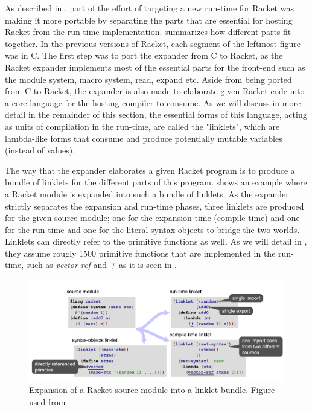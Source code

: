 \label{subsec:racket-expand}

As described in , part of the effort of targeting a
new run-time for Racket was making it more portable by separating the
parts that are essential for hosting Racket from the run-time
implementation.  summarizes how different
parts fit together. In the previous versions of Racket, each segment
of the leftmost figure was in C. The first step was to port the
expander from C to Racket, as the Racket expander implements most of
the essential parts for the front-end such as the module system, macro
system, read, expand etc. Aside from being ported from C to Racket,
the expander is also made to elaborate given Racket code into a core
language for the hosting compiler to consume. As we will discuss in
more detail in the remainder of this section, the essential forms of
this language, acting as units of compilation in the run-time, are
called the "linklets", which are lambda-like forms that consume and
produce potentially mutable variables (instead of values).

The way that the expander elaborates a given Racket program is to
produce a bundle of linklets for the different parts of this
program.  shows an example where a
Racket module is expanded into such a bundle of linklets. As the
expander strictly separates the expansion and run-time phases, three
linklets are produced for the given source module; one for the
expansion-time (compile-time) and one for the run-time and one for the
literal syntax objects to bridge the two worlds. Linklets can directly
refer to the primitive functions as well. As we will detail in
, they assume rougly 1500 primitive functions
that are implemented in the run-time, such as \emph{vector-ref} and
\emph{+} as it is seen in .

\begin{figure}[h]
  \centering
  \includegraphics[scale=0.3]{img/racket-expand-example}
  \caption{Expansion of a Racket source module into a linklet
    bundle. Figure used from \cite{racket-on-chez-19}}
  \label{fig:racket-expand-example}
\end{figure}

